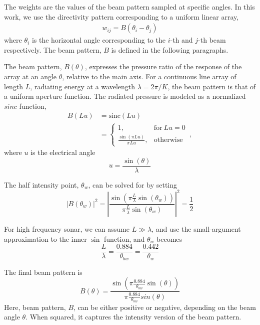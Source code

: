 \documentclass[utf8]{frontiersSCNS} %
\begin{document}
The weights are the values of the beam pattern sampled at specific angles. In this work, we use the directivity pattern corresponding to a uniform linear array,
\begin{align}
    w_{ij} = B(\theta_{i} - \theta_j)
    \label{e:weights}
\end{align}
where $\theta_i$ is the horizontal angle corresponding to the $i$-th and $j$-th beam respectively. The beam pattern, $B$ is defined in the following paragraphs.

 
The beam pattern, $B(\theta)$, expresses the pressure ratio of the response of the array at an angle $\theta$, relative to the main axis.  For a continuous line array of length $L$, radiating energy at a wavelength $\lambda=2\pi/K$, the beam pattern is that of a uniform aperture function. The radiated pressure is modeled as a normalized $sinc$ function,
\begin{align}
    B(Lu)&= \textrm{sinc}(Lu) \\ 
    &= \begin{cases}
      1, & \mathrm{for}\: Lu = 0 \\
       \frac{\sin(\pi L u)}{\pi L u}, & \mathrm{otherwise} \nonumber
    \end{cases}\, ,
\end{align}
where $u$ is the electrical angle
\begin{equation}
    u = \frac{\sin(\theta)}{\lambda}
\end{equation}

The half intensity point, $\theta_w$, can be solved for by setting
\begin{equation}
    |B(\theta_w)|^2 = \left|\frac{\sin\left(\pi\frac{L}{\lambda}\sin(\theta_w)\right)}{\pi\frac{L}{\lambda}\sin(\theta_w)}\right|^2 = \frac{1}{2}    
\end{equation}

For high frequency sonar, we can assume $L \gg \lambda$, and use the small-argument approximation to the inner $\sin$ function, and $\theta_w$ becomes 
\begin{equation}
    \frac{L}{\lambda} = \frac{0.884}{\theta_{bw}} = \frac{0.442}{\theta_w}
\end{equation}

The final beam pattern is 
\begin{equation}
    B(\theta) = \frac{\sin\left(\pi\frac{0.884}{\theta_{bw}}\sin(\theta)\right)}{\pi \frac{0.884}{\theta_{bw}}sin(\theta)}
    \label{e:beampattern}
\end{equation}
Here, beam pattern, $B$, can be either positive or negative, depending on the beam angle $\theta$. When squared, it captures the intensity version of the beam pattern. 
\end{document}
